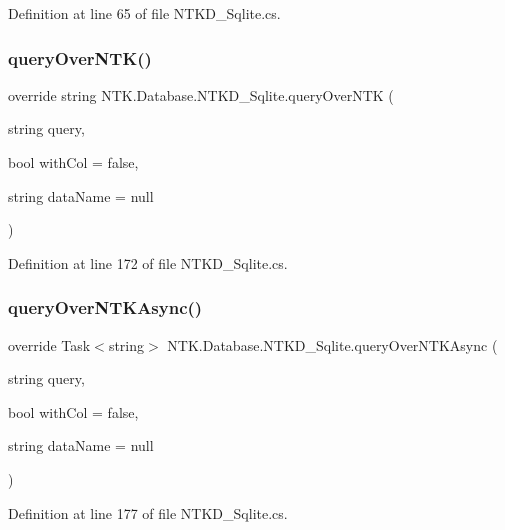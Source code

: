 Definition at line 65 of file N\+T\+K\+D\+\_\+\+Sqlite.\+cs.

\mbox{\label{class_n_t_k_1_1_database_1_1_n_t_k_d___sqlite_a0edda2f8ed2b6fa0804e981b772d3b4c}} 
\subsubsection{\texorpdfstring{queryOverNTK()}{queryOverNTK()}}
{\footnotesize\ttfamily override string N\+T\+K.\+Database.\+N\+T\+K\+D\+\_\+\+Sqlite.\+query\+Over\+N\+TK (\begin{DoxyParamCaption}\item[{string}]{query,  }\item[{bool}]{with\+Col = {\ttfamily false},  }\item[{string}]{data\+Name = {\ttfamily null} }\end{DoxyParamCaption})}



Definition at line 172 of file N\+T\+K\+D\+\_\+\+Sqlite.\+cs.

\mbox{\label{class_n_t_k_1_1_database_1_1_n_t_k_d___sqlite_abdd5676e9856bb63542fe48ba36e2374}} 
\subsubsection{\texorpdfstring{queryOverNTKAsync()}{queryOverNTKAsync()}}
{\footnotesize\ttfamily override Task$<$string$>$ N\+T\+K.\+Database.\+N\+T\+K\+D\+\_\+\+Sqlite.\+query\+Over\+N\+T\+K\+Async (\begin{DoxyParamCaption}\item[{string}]{query,  }\item[{bool}]{with\+Col = {\ttfamily false},  }\item[{string}]{data\+Name = {\ttfamily null} }\end{DoxyParamCaption})}



Definition at line 177 of file N\+T\+K\+D\+\_\+\+Sqlite.\+cs.

